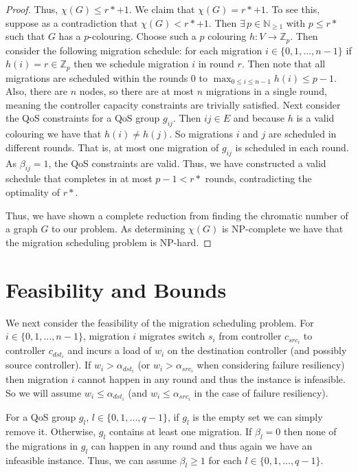 \documentclass[conference]{IEEEtran}
\begin{document}
\begin{proof}
    Thus, $\chi(G) \leq r* + 1$. We claim that $\chi(G) = r* + 1$. To see this, suppose as a contradiction that $\chi(G) < r* + 1$. Then $\exists \, p \in \mathbb{N}_{\geq 1}$ with $p \leq r*$ such that $G$ has a $p$-colouring. Choose such a $p$ colouring $h: V \rightarrow \mathbb{Z}_{p}$. Then consider the following migration schedule: for each migration $i \in \{0, 1, ..., n-1\}$ if $h(i) = r \in \mathbb{Z}_{p}$ then we schedule migration $i$ in round $r$. Then note that all migrations are scheduled within the rounds 0 to $\max_{0 \leq i \leq n-1} h(i) \leq p - 1$. Also, there are $n$ nodes, so there are at most $n$ migrations in a single round, meaning the controller capacity constraints are trivially satisfied. Next consider the QoS constraints for a QoS group $g_{ij}$. Then $ij \in E$ and because $h$ is a valid colouring we have that $h(i) \neq h(j)$. So migrations $i$ and $j$ are scheduled in different rounds. That is, at most one migration of $g_{ij}$ is scheduled in each round. As $\beta_{ij} = 1$, the QoS constraints are valid. Thus, we have constructed a valid schedule that completes in at most $p - 1 < r*$ rounds, contradicting the optimality of $r*$.
    
    Thus, we have shown a complete reduction from finding the chromatic number of a graph $G$ to our problem. As determining $\chi(G)$ is NP-complete we have that the migration scheduling problem is NP-hard. 
\end{proof}

\section{Feasibility and Bounds}
\noindent We next consider the feasibility of the migration scheduling problem. For $i \in \{0, 1, ..., n-1\}$, migration $i$ migrates switch $s_{i}$ from controller $c_{src_{i}}$ to controller $c_{dst_{i}}$ and incurs a load of $w_{i}$ on the destination controller (and possibly source controller). If $w_{i} > \alpha_{dst_{i}}$ (or $w_{i} > \alpha_{src_{i}}$ when considering failure resiliency) then migration $i$ cannot happen in any round and thus the instance is infeasible. So we will assume $w_{i} \leq \alpha_{dst_{i}}$ (and $w_{i} \leq \alpha_{src_{i}}$ in the case of failure resiliency).

For a QoS group $g_{l}$, $l \in \{0, 1, ..., q - 1\}$, if $g_{l}$ is the empty set we can simply remove it. Otherwise, $g_{l}$ contains at least one migration. If $\beta_{l} = 0$ then none of the migrations in $g_{l}$ can happen in any round and thus again we have an infeasible instance. Thus, we can assume $\beta_{l} \geq 1$ for each $l \in \{0, 1, ..., q - 1\}$.
\end{document}
